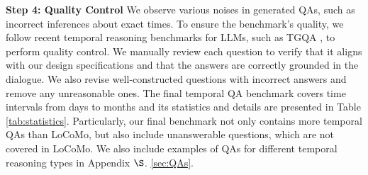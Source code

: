 \noindent \textbf{Step 4: Quality Control}
We observe various noises in generated QAs, such as incorrect inferences about exact times. To ensure the benchmark’s quality, we follow recent temporal reasoning benchmarks for LLMs, such as TGQA \cite{xiong-etal-2024-large}, to perform quality control. We manually review each question to verify that it aligns with our design specifications and that the answers are correctly grounded in the dialogue. We also revise well-constructed questions with incorrect answers and remove any unreasonable ones. The final temporal QA benchmark covers time intervals from days to months and its statistics and details are presented in Table \ref{tab:statistics}. Particularly, our final benchmark not only contains more temporal QAs than LoCoMo, but also include unanswerable questions, which are not covered in LoCoMo. We also include examples of QAs for different temporal reasoning types in Appendix $\S$. \ref{sec:QAs}.
